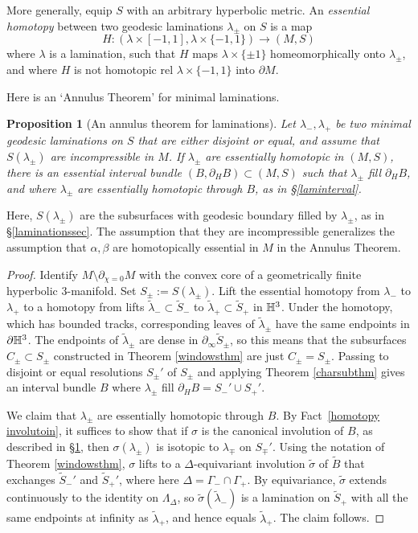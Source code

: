 \documentclass[12pt]{amsart}
\newtheorem{prop}[theorem]{Proposition}
\theoremstyle{definition}
\theoremstyle{remark}
\begin{document}
More generally, equip $S$ with an arbitrary hyperbolic metric. An \emph{essential homotopy} between two geodesic laminations $\lambda_\pm$ on $S$ is a map $$H : (\lambda \times [-1,1],\lambda \times \{-1,1\}) \longrightarrow (M,S) $$ where $\lambda $ is a lamination, such that $H$ maps $\lambda \times \{\pm 1\}$ homeomorphically onto $\lambda_\pm$, and where $H$ is not homotopic rel $\lambda \times \{-1,1\}$ into $\partial M$. 

 Here is an `Annulus Theorem' for minimal laminations.

\begin{prop}[An annulus theorem for laminations]\label {intervalbundle}
Let $\lambda_-,\lambda_+ $ be two minimal geodesic laminations on $S $ that are either disjoint or equal, and assume that $S (\lambda_\pm) $ are incompressible in $ M $. If $\lambda_\pm $ are essentially homotopic in $(M,S)$, there is an essential interval bundle $(B,\partial_H B) \subset (M,S)$ such that $\lambda_\pm$ fill $\partial_H B$, and where $\lambda_\pm$ are essentially homotopic through $B$, as in \S \ref{laminterval}.
\end{prop}

 Here, $S (\lambda_\pm)$ are the subsurfaces with geodesic boundary filled by $\lambda_\pm$, as in \S \ref{laminationssec}. The assumption that they are incompressible  generalizes the  assumption that $\alpha,\beta$ are homotopically essential in $M$ in the Annulus Theorem.


\begin{proof}
Identify $M\setminus \partial_{\chi=0} M$ with the convex core of a geometrically finite hyperbolic $3$-manifold. Set $S_\pm := S(\lambda_\pm)$. Lift the essential homotopy from $\lambda_-$ to $\lambda_+$ to a homotopy from lifts $\tilde \lambda_-\subset \tilde S_-$ to $\tilde \lambda_+\subset \tilde S_+$ in $\mathbb H^3$. Under the homotopy, which has bounded tracks, corresponding leaves of $\tilde \lambda_\pm$ have the same endpoints in $\partial \mathbb H^3$. The endpoints of $\tilde \lambda_\pm $ are dense in $\partial_\infty \tilde S_\pm$, so this means that the subsurfaces $C_\pm \subset S_\pm$ constructed in Theorem \ref{windowsthm} are just $C_\pm=S_\pm$. Passing to disjoint or equal resolutions $S_\pm'$ of $S_\pm$ and applying Theorem \ref{charsubthm} gives an interval bundle $B$ where $\lambda_\pm$ fill $\partial_H B=S_-'\cup S_+'$. 

We claim that $\lambda_\pm$ are essentially homotopic through $B$. By Fact~\ref{homotopy involutoin}, it suffices to show that if $\sigma$ is the canonical involution of $B$, as described in  \S \ref{intervalbundle}, then $\sigma(\lambda_\pm) $ is isotopic to $\lambda_\mp$ on $S_\mp'$. Using the notation of Theorem \ref{windowsthm}, $\sigma$ lifts to a $\Delta$-equivariant involution $\tilde \sigma$ of $\tilde B$ that exchanges $\tilde S_-'$ and $\tilde S_+'$, where here $\Delta = \Gamma_-\cap \Gamma_+$. By equivariance, $\tilde \sigma$ extends continuously to the identity on $\Lambda_\Delta$, so $\tilde \sigma(\tilde \lambda_-)$ is a lamination on $\tilde S_+$ with all the same endpoints at infinity as $\tilde \lambda_+$, and hence equals $\tilde\lambda_+$. The claim follows.
\end{proof}
\end{document}
